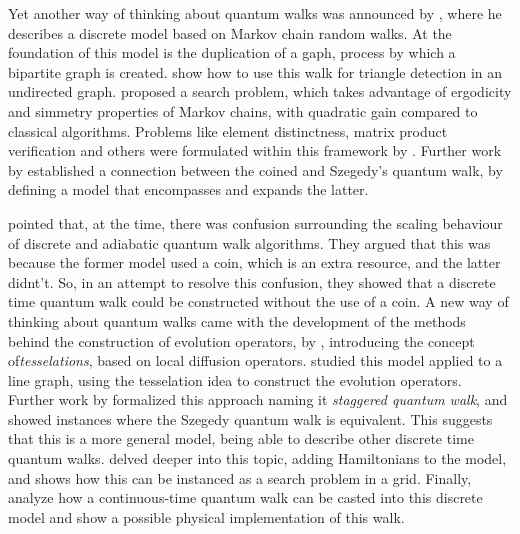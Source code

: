 \documentclass[../../dissertation.tex]{subfiles}
\begin{document}
Yet another way of thinking about quantum walks was announced by
\cite{szegedy2004}, where he describes a discrete model based on Markov chain
random walks. At the foundation of this model is the duplication of a gaph,
process by which a bipartite graph is created. \cite{magniez2005} show how to
use this walk for triangle detection in an undirected graph. \cite{magniez2006}
proposed a search problem, which takes advantage of ergodicity and simmetry
properties of Markov chains, with quadratic gain compared to classical
algorithms. Problems like element distinctness, matrix product verification and
others were formulated within this framework by \cite{santha2008}. Further work
by \cite{portugal2015} established a connection between the coined and Szegedy's quantum
walk, by defining a model that encompasses and expands the latter.\par 

\cite{patel2004} pointed that, at the time, there was confusion surrounding the
scaling behaviour of discrete and adiabatic quantum walk algorithms. They
argued that this was because the former model used a coin, which is an extra
resource, and the latter didnt't. So, in an attempt to resolve this confusion,
they showed that a discrete time quantum walk could be constructed without the
use of a coin. 
A new way of thinking about quantum walks came with the
development of the methods behind the construction of evolution operators, by
\cite{falk2013}, introducing the concept of\textit{tesselations}, based on
local diffusion operators. \cite{portugal2014} studied this model applied to a
line graph, using the tesselation idea to construct the evolution operators.
Further work by \cite{portugal2015b} formalized this approach naming it
\textit{staggered quantum walk}, and showed instances where the Szegedy quantum
walk is equivalent. This suggests that this is a more general model, being able
to describe other discrete time quantum walks. \cite{portugal2017b} delved
deeper into this topic, adding Hamiltonians to the model, and
\cite{portugal2017a} shows how this can be instanced as a search problem in a
grid. Finally, \cite{coutinho2017} analyze how a continuous-time quantum walk
can be casted into this discrete model and \cite{moqadam2016} show a
possible physical implementation of this walk.
\end{document}
